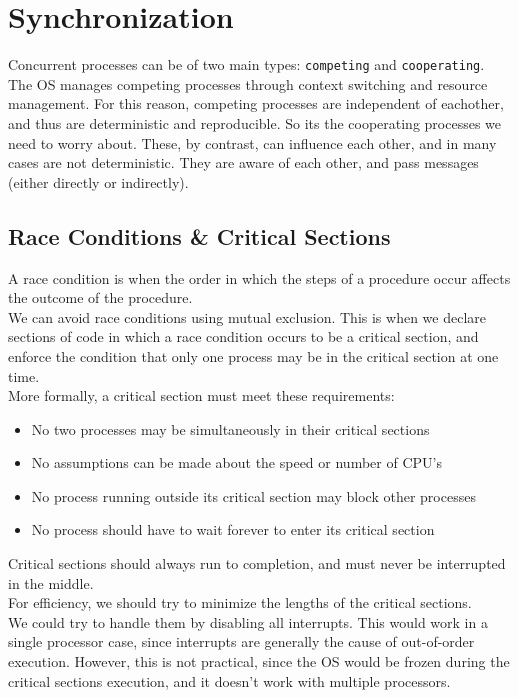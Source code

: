 \documentclass[12pt]{article}
\theoremstyle{definition}
\begin{document}
\section{Synchronization}
Concurrent processes can be of two main types: \texttt{competing} and \texttt{cooperating}. The OS manages competing processes through context switching and resource management. For this reason, competing processes are independent of eachother, and thus are deterministic and reproducible. So its the cooperating processes we need to worry about. These, by contrast, can influence each other, and in many cases are not deterministic. They are aware of each other, and pass messages (either directly or indirectly). 
\\ \linebreak
\subsection{Race Conditions \& Critical Sections}
A race condition is when the order in which the steps of a procedure occur affects the outcome of the procedure.
\\ \linebreak
We can avoid race conditions using mutual exclusion. This is when we declare sections of code in which a race condition occurs to be a critical section, and enforce the condition that only one process may be in the critical section at one time.
\\ \linebreak
More formally, a critical section must meet these requirements:

\begin{itemize}
	\item No two processes may be simultaneously in their critical sections
	\item No assumptions can be made about the speed or number of CPU's
	\item No process running outside its critical section may block other processes
	\item No process should have to wait forever to enter its critical section
\end{itemize}
Critical sections should always run to completion, and must never be interrupted in the middle.
\\ \linebreak
For efficiency, we should try to minimize the lengths of the critical sections.
\\ \linebreak
We could try to handle them by disabling all interrupts. This would work in a single processor case, since interrupts are generally the cause of out-of-order execution. However, this is not practical, since the OS would be frozen during the critical sections execution, and it doesn't work with multiple processors.
\end{document}
